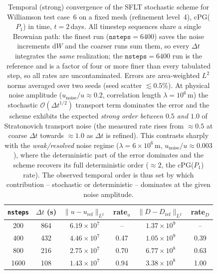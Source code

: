 \begin{table}[htbp]
  \centering
  \begin{tabular}{c c c c c c}
    \toprule
    \texttt{nsteps} & $\Delta t$ (s) & $\|u-u_{\mathrm{ref}}\|_{L^2}$ & rate$_u$
        & $\|D-D_{\mathrm{ref}}\|_{L^2}$ & rate$_D$ \\
    \midrule
    200  & 864 & $6.19\times10^{7}$ & --   & $1.37\times10^{9}$ & --   \\
    400  & 432 & $4.46\times10^{7}$ & 0.47 & $1.05\times10^{9}$ & 0.39 \\
    800  & 216 & $2.75\times10^{7}$ & 0.70 & $6.77\times10^{8}$ & 0.63 \\
    1600 & 108 & $1.43\times10^{7}$ & 0.94 & $3.38\times10^{8}$ & 1.00 \\
    \bottomrule
  \end{tabular}
  \caption{Temporal (strong) convergence of the SFLT stochastic scheme for
    Williamson test case~6 on a fixed mesh (refinement level~4), cPG($P_1$) in
    time, $t = 2$\,days. All timestep sequences share a single Brownian path: the
    finest run ($\texttt{nsteps}=6400$) saves the noise increments $\mathrm{d}W$
    and the coarser runs sum them, so every $\Delta t$ integrates the \emph{same}
    realization; the $\texttt{nsteps}=6400$ run is the reference and is a factor
    of four or more finer than every tabulated step, so all rates are
    uncontaminated. Errors are area-weighted $L^2$ norms averaged over two seeds
    (seed scatter $\lesssim 0.5\%$). At physical noise amplitude
    ($u_{\mathrm{noise}}/u \approx 0.2$, correlation length $\lambda = 10^{6}$\,m)
    the stochastic $\mathcal{O}(\Delta t^{1/2})$ transport term dominates the
    error and the scheme exhibits the expected \emph{strong order between $0.5$
    and $1.0$} of Stratonovich transport noise (the measured rate rises from
    $\approx 0.5$ at coarse $\Delta t$ towards $\approx 1.0$ as $\Delta t$ is
    refined).
    This contrasts sharply with the \emph{weak/resolved} noise regime
    ($\lambda = 6\times10^{6}$\,m, $u_{\mathrm{noise}}/u \approx 0.003$), where
    the deterministic part of the error dominates and the scheme recovers its
    full deterministic order ($\approx 2$, the cPG($P_1$) rate). The observed
    temporal order is thus set by which contribution -- stochastic or
    deterministic -- dominates at the given noise amplitude.}
  \label{tab:w6-sflt-temporal}
\end{table}


